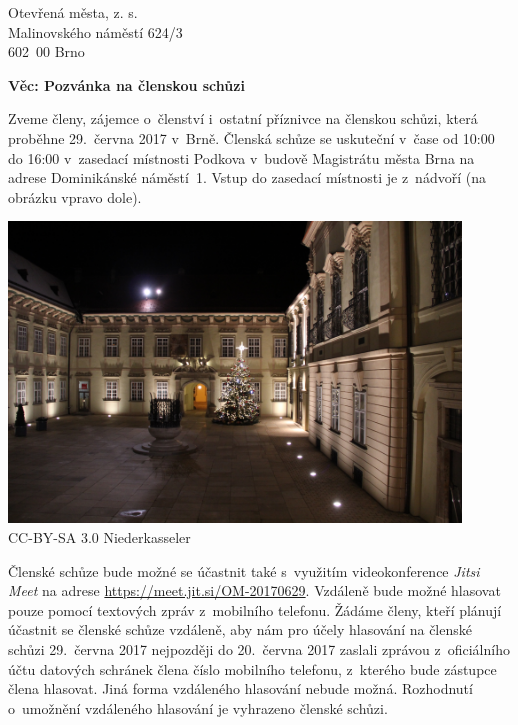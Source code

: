 \documentclass[a4paper,12pt]{letter}
\begin{document}
\pagestyle{empty}
\begin{letter}{}{}
\begin{flushleft}
Otevřená města, z. s.\\ Malinovského náměstí 624/3\\ 602\ 00 Brno
\end{flushleft}
\date{V Brně dne 13.\ června 2017}

\opening{\textbf{Věc: Pozvánka na členskou schůzi}}

Zveme členy, zájemce o~členství i~ostatní příznivce na členskou schůzi, která
proběhne 29.\ června 2017 v~Brně. Členská schůze se uskuteční v~čase od 10:00 do
16:00 v~zasedací místnosti Podkova v~budově Magistrátu města Brna na adrese
Dominikánské náměstí\ 1. Vstup do zasedací místnosti je z~nádvoří (na obrázku
vpravo dole).

\begin{center} 
\includegraphics[width=0.9\textwidth]{Vecer_by_Niederkasseler_-_panoramio}\\
CC-BY-SA 3.0 Niederkasseler
\end{center} 

Členské schůze bude možné se účastnit také s~využitím videokonference
\emph{Jitsi Meet} na adrese
\href{https://meet.jit.si/OM-20170629}{https://meet.jit.si/OM-20170629}.
Vzdáleně bude možné hlasovat pouze pomocí textových zpráv z~mobilního telefonu.
Žádáme členy, kteří plánují účastnit se členské schůze vzdáleně, aby nám pro
účely hlasování na členské schůzi 29.\ června 2017 nejpozději do 20.\ června
2017 zaslali zprávou z~oficiálního účtu datových schránek člena číslo mobilního
telefonu, z~kterého bude zástupce člena hlasovat. Jiná forma vzdáleného
hlasování nebude možná. Rozhodnutí o~umožnění vzdáleného hlasování je vyhrazeno
členské schůzi.


\end{letter}
\end{document}
